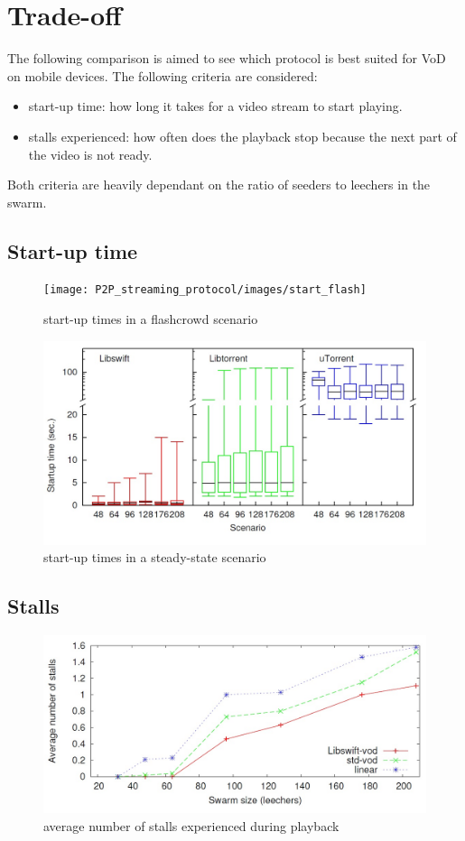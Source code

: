 \section{Trade-off}
The following comparison is aimed to see which protocol is best suited for VoD on mobile devices. The following criteria are considered:
\begin{itemize}
	\item start-up time: how long it takes for a video stream to start playing.
	\item stalls experienced: how often does the playback stop because the next part of the video is not ready.
\end{itemize}
Both criteria are heavily dependant on the ratio of seeders to leechers in the swarm. 

\subsection{Start-up time}
\begin{figure}[h]
	\centering
	\texttt{[image: P2P\_streaming\_protocol/images/start\_flash]}
	\caption{start-up times in a flashcrowd scenario}
	\label{fig:start_flash}
\end{figure}

\begin{figure}[h]
	\centering
	\includegraphics{P2P_streaming_protocol/images/start_steady}
	\caption{start-up times in a steady-state scenario}
	\label{fig:start_steady}
\end{figure}


\subsection{Stalls}

\begin{figure}[h]
	\centering
	\includegraphics{P2P_streaming_protocol/images/stalls}
	\caption{average number of stalls experienced during playback}
	\label{fig:stalls}
\end{figure}
